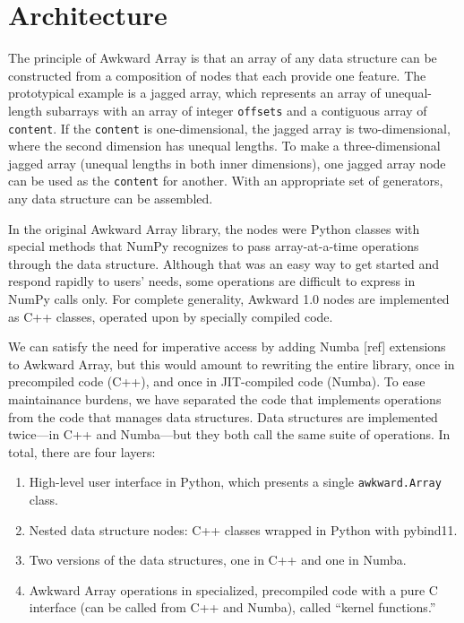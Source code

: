 \documentclass{webofc}
\begin{document}
\section{Architecture}

The principle of Awkward Array is that an array of any data structure can be constructed from a composition of nodes that each provide one feature. The prototypical example is a jagged array, which represents an array of unequal-length subarrays with an array of integer \texttt{offsets} and a contiguous array of \texttt{content}. If the \texttt{content} is one-dimensional, the jagged array is two-dimensional, where the second dimension has unequal lengths. To make a three-dimensional jagged array (unequal lengths in both inner dimensions), one jagged array node can be used as the \texttt{content} for another. With an appropriate set of generators, any data structure can be assembled.

In the original Awkward Array library, the nodes were Python classes with special methods that NumPy recognizes to pass array-at-a-time operations through the data structure. Although that was an easy way to get started and respond rapidly to users' needs, some operations are difficult to express in NumPy calls only. For complete generality, Awkward 1.0 nodes are implemented as C++ classes, operated upon by specially compiled code.

We can satisfy the need for imperative access by adding Numba [ref] extensions to Awkward Array, but this would amount to rewriting the entire library, once in precompiled code (C++), and once in JIT-compiled code (Numba). To ease maintainance burdens, we have separated the code that implements operations from the code that manages data structures. Data structures are implemented twice---in C++ and Numba---but they both call the same suite of operations. In total, there are four layers:

\begin{enumerate}
\item High-level user interface in Python, which presents a single \texttt{awkward.Array} class.
\item Nested data structure nodes: C++ classes wrapped in Python with pybind11.
\item Two versions of the data structures, one in C++ and one in Numba.
\item Awkward Array operations in specialized, precompiled code with a pure C interface (can be called from C++ and Numba), called ``kernel functions.''
\end{enumerate}
\end{document}
